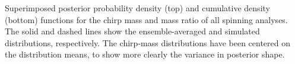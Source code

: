 \label{fig:mass_pdfs} Superimposed posterior probability density (top) and cumulative density (bottom) functions for the chirp mass and mass ratio of all spinning analyses.  The solid and dashed lines show the ensemble-averaged and simulated distributions, respectively.  The chirp-mass distributions have been centered on the distribution means, to show more clearly the variance in posterior shape.